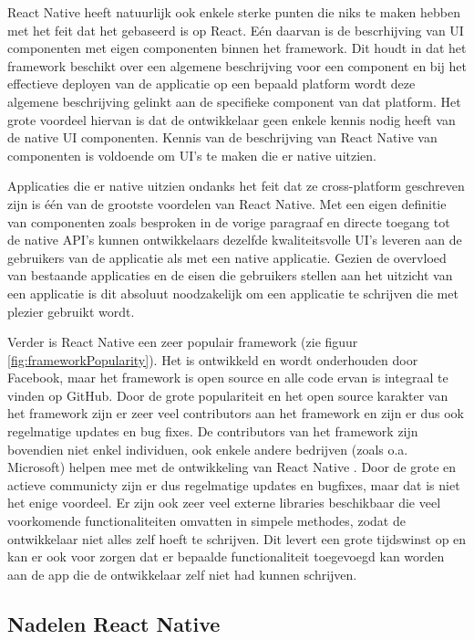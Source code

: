 React Native heeft natuurlijk ook enkele sterke punten die niks te maken hebben met het feit dat het gebaseerd is op React. Eén daarvan is de bescrhijving van UI componenten met eigen componenten binnen het framework. Dit houdt in dat het framework beschikt over een algemene beschrijving voor een component en bij het effectieve deployen van de applicatie op een bepaald platform wordt deze algemene beschrijving gelinkt aan de specifieke component van dat platform. Het grote voordeel hiervan is dat de ontwikkelaar geen enkele kennis nodig heeft van de native UI componenten. Kennis van de beschrijving van React Native van componenten is voldoende om UI's te maken die er native uitzien. 

Applicaties die er native uitzien ondanks het feit dat ze cross-platform geschreven zijn is één van de grootste voordelen van React Native. Met een eigen definitie van componenten zoals besproken in de vorige paragraaf en directe toegang tot de native API's kunnen ontwikkelaars dezelfde kwaliteitsvolle UI's leveren aan de gebruikers van de applicatie als met een native applicatie. Gezien de overvloed van bestaande applicaties en de eisen die gebruikers stellen aan het uitzicht van een applicatie is dit absoluut noodzakelijk om een applicatie te schrijven die met plezier gebruikt wordt.

Verder is React Native een zeer populair framework (zie figuur \ref{fig:frameworkPopularity}). Het is ontwikkeld en wordt onderhouden door Facebook, maar het framework is open source en alle code ervan is integraal te vinden op GitHub. Door de grote populariteit en het open source karakter van het framework zijn er zeer veel contributors aan het framework en zijn er dus ook regelmatige updates en bug fixes. De contributors van het framework zijn bovendien niet enkel individuen, ook enkele andere bedrijven (zoals o.a. Microsoft) helpen mee met de ontwikkeling van React Native \autocite{Nakazawa2019}. Door de grote en actieve communicty zijn er dus regelmatige updates en bugfixes, maar dat is niet het enige voordeel. Er zijn ook zeer veel externe libraries beschikbaar die veel voorkomende functionaliteiten omvatten in simpele methodes, zodat de ontwikkelaar niet alles zelf hoeft te schrijven. Dit levert een grote tijdswinst op en kan er ook voor zorgen dat er bepaalde functionaliteit toegevoegd kan worden aan de app die de ontwikkelaar zelf niet had kunnen schrijven.

\subsection{Nadelen React Native}
\label{subsec:nadelenReactNative}
